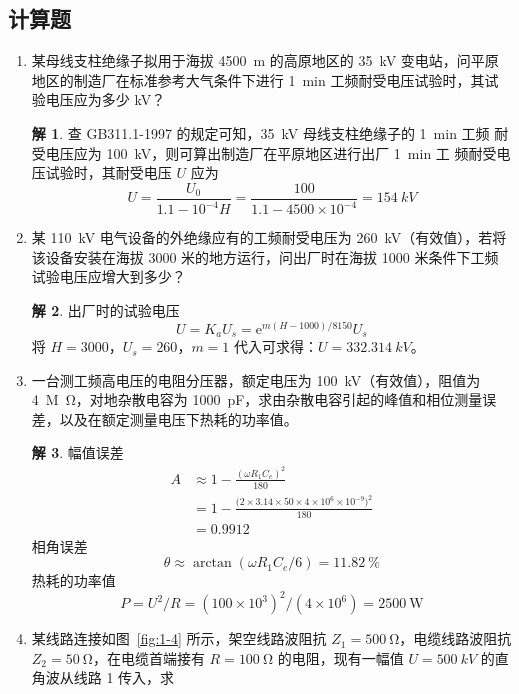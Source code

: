\documentclass[zihao=-4,fontset = none]{ctexart}
\theoremstyle{definition}
\newtheorem*{solution}{解}
\def\ee{\mathrm{e}}
\begin{document}
\subsection{计算题}
\begin{enumerate}
  \item 某母线支柱绝缘子拟用于海拔 \SI{4500}{m} 的高原地区的 \SI{35}{kV} 变电站，问平原地区的制造厂在标准参考大气条件下进行 \SI{1}{min} 工频耐受电压试验时，其试验电压应为多少 \si{kV}？
  \begin{solution}
    查 GB311.1-1997 的规定可知，\SI{35}{kV} 母线支柱绝缘子的 \SI{1}{min} 工频
    耐受电压应为 \SI{100}{kV}，则可算出制造厂在平原地区进行出厂 \SI{1}{min} 工
    频耐受电压试验时，其耐受电压 $U$ 应为
    \[ U = \frac{U_0}{1.1-10^{-4}H} = \frac{100}{1.1-4500\times 10^{-4}} = \SI{154}{kV} \]
  \end{solution}
  \item 某 \SI{110}{kV} 电气设备的外绝缘应有的工频耐受电压为 \SI{260}{kV}（有效值），若将该设备安装在海拔 \num{3000} 米的地方运行，问出厂时在海拔 \num{1000} 米条件下工频试验电压应增大到多少？
  \begin{solution}
    出厂时的试验电压
    \[ U = K_a U_s = \ee^{m(H-1000)/8150} U_s \]
    将 $H=3000$，$U_s=260$，$m=1$ 代入可求得：$U = \SI{332.314}{kV}$。
  \end{solution}
  \item 一台测工频高电压的电阻分压器，额定电压为 \SI{100}{kV}（有效值），阻值为 \SI{4}{M\ohm}，对地杂散电容为 \SI{1000}{pF}，求由杂散电容引起的峰值和相位测量误差，以及在额定测量电压下热耗的功率值。
  \begin{solution}
    幅值误差
    \begin{align*}
      A &\approx 1 - \frac{(\omega R_1 C_e)^2}{180} \\
        &= 1 - \frac{\bigl( 2 \times 3.14 \times 50 \times 4 \times 10^6 \times 10^{-9} \bigr)^2}{180} \\
        &= 0.9912
    \end{align*}
    相角误差
    \[ \theta \approx \arctan(\omega R_1 C_e / 6) = \SI{11.82}{\percent} \]
    热耗的功率值
    \[ P = U^2/R = (100\times 10^3)^2/(4\times 10^6) = \SI{2500}{\W} \]
  \end{solution}
  \item \label{ti:1-4}某线路连接如图~\ref{fig:1-4} 所示，架空线路波阻抗 $Z_1 = \SI{500}{\ohm}$，电缆线路波阻抗 $Z_2 = \SI{50}{\ohm}$，在电缆首端接有 $R = \SI{100}{\ohm}$ 的电阻，现有一幅值 $U = \SI{500}{kV}$ 的直角波从线路 1 传入，求
  \begin{enumerate}

\end{enumerate}
\end{enumerate}
\end{document}
